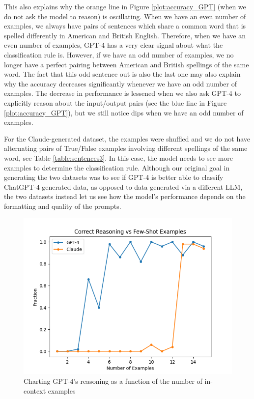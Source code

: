 \documentclass{article}
\begin{document}
This also explains why the orange line in Figure \ref{plot:accuracy_GPT} (when we do not ask the model to reason) is oscillating. 
When we have an even number of examples, we always have pairs of sentences which share a common word that is spelled differently in American and British English.
Therefore, when we have an even number of examples, GPT-4 has a very clear signal about what the classification rule is. 
However, if we have an odd number of examples, we no longer have a perfect pairing between American and British spellings of the same word.
The fact that this odd sentence out is also the last one may also explain why the accuracy decreases significantly whenever we have an odd number of examples.
The decrease in performance is lessened when we also ask GPT-4 to explicitly reason about the input/output pairs (see the blue line in Figure \ref{plot:accuracy_GPT}), but we still notice dips when we have an odd number of examples.

For the Claude-generated dataset, the examples were shuffled and we do not have alternating pairs of True/False examples involving different spellings of the same word, see Table \ref{table:sentences3}.
In this case, the model needs to see more examples to determine the classification rule.
Although our original goal in generating the two datasets was to see if GPT-4 is better able to classify ChatGPT-4 generated data, as opposed to data generated via a different LLM, the two datasets instead let us see how the model's performance depends on the formatting and quality of the prompts.

\begin{figure}[ht]
\centering
\includegraphics[scale=.6]{./figures/reasoning_plot.png}
\caption{Charting GPT-4's reasoning as a function of the number of in-context examples}
\label{plot:reasoning}
\end{figure}
\end{document}
